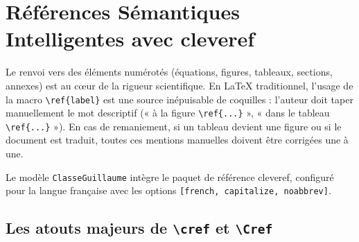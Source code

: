 \section{Références Sémantiques Intelligentes avec \textsf{cleveref}}
\label{sec:references_cleveref}

Le renvoi vers des éléments numérotés (équations, figures, tableaux, sections, annexes) est au cœur de la rigueur scientifique.
En \LaTeX{} traditionnel, l'usage de la macro \texttt{\textbackslash ref\{label\}} est une source inépuisable de coquilles :
l'auteur doit taper manuellement le mot descriptif (« à la figure \texttt{\textbackslash ref\{...\}} », « dans le tableau \texttt{\textbackslash ref\{...\}} »).
En cas de remaniement, si un tableau devient une figure ou si le document est traduit, toutes ces mentions manuelles doivent être corrigées une à une.

Le modèle \texttt{ClasseGuillaume} intègre le paquet de référence \textsf{cleveref}, configuré pour la langue française avec les options \texttt{[french, capitalize, noabbrev]}.

\subsection{Les atouts majeurs de \texttt{\textbackslash cref} et \texttt{\textbackslash Cref}}
\label{subsec:atouts_cleveref}

